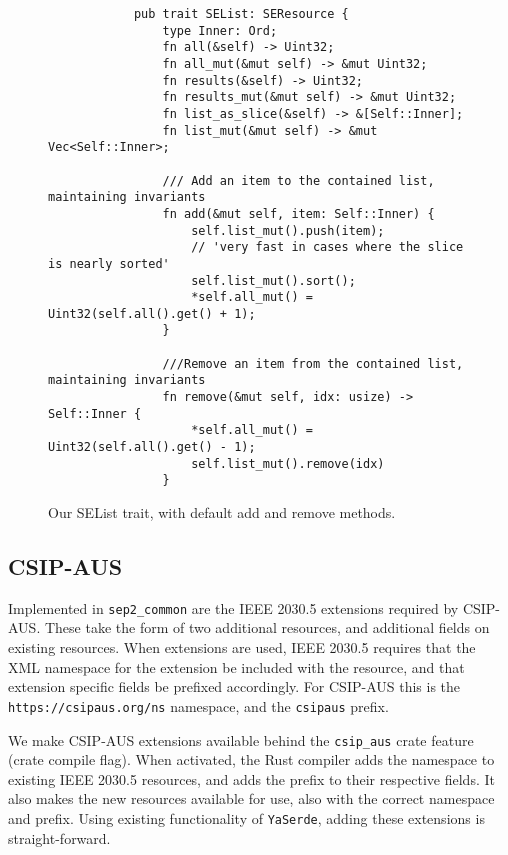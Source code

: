 \begin{figure}[H]
    \begin{center}
        \begin{lstlisting}
            pub trait SEList: SEResource {
                type Inner: Ord;
                fn all(&self) -> Uint32;
                fn all_mut(&mut self) -> &mut Uint32;
                fn results(&self) -> Uint32;
                fn results_mut(&mut self) -> &mut Uint32;
                fn list_as_slice(&self) -> &[Self::Inner];
                fn list_mut(&mut self) -> &mut Vec<Self::Inner>;
            
                /// Add an item to the contained list, maintaining invariants
                fn add(&mut self, item: Self::Inner) {
                    self.list_mut().push(item);
                    // 'very fast in cases where the slice is nearly sorted'
                    self.list_mut().sort();
                    *self.all_mut() = Uint32(self.all().get() + 1);
                }
                
                ///Remove an item from the contained list, maintaining invariants
                fn remove(&mut self, idx: usize) -> Self::Inner {
                    *self.all_mut() = Uint32(self.all().get() - 1);
                    self.list_mut().remove(idx)
                }
        \end{lstlisting}
        \label{fig:listtraitimpl}
        \caption{Our SEList trait, with default add and remove methods.}
    \end{center}
\end{figure}

\subsection{CSIP-AUS}
Implemented in \texttt{sep2\_common} are the IEEE 2030.5 extensions required by CSIP-AUS. These take the form of two additional resources, and additional fields on existing resources. When extensions are used, IEEE 2030.5 requires that the XML namespace for the extension be included with the resource, and that extension specific fields be prefixed accordingly. For CSIP-AUS this is the \texttt{https://csipaus.org/ns} namespace, and the \texttt{csipaus} prefix. \cite{CSIPAus}

We make CSIP-AUS extensions available behind the \texttt{csip\_aus} crate feature (crate compile flag). When activated, the Rust compiler adds the namespace to existing IEEE 2030.5 resources, and adds the prefix to their respective fields. It also makes the new resources available for use, also with the correct namespace and prefix. Using existing functionality of \texttt{YaSerde}, adding these extensions is straight-forward.

